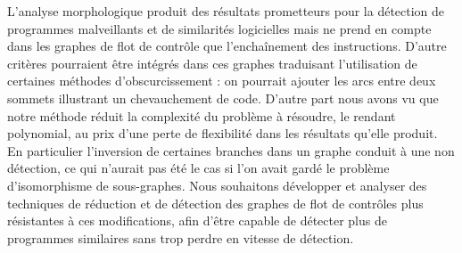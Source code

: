 L'analyse morphologique produit des résultats prometteurs pour la détection de programmes malveillants et de similarités logicielles mais ne prend en compte dans les graphes de flot de contrôle que l'enchaînement des instructions. D'autre critères pourraient être intégrés dans ces graphes traduisant l'utilisation de certaines méthodes d'obscurcissement : on pourrait ajouter les arcs entre deux sommets illustrant un chevauchement de code.
D'autre part nous avons vu que notre méthode réduit la complexité du problème à résoudre, le rendant polynomial, au prix d'une perte de flexibilité dans les résultats qu'elle produit. 
En particulier l'inversion de certaines branches  dans un graphe conduit à une non détection, ce qui n'aurait pas été le cas si l'on avait gardé le problème d'isomorphisme de sous-graphes.
Nous souhaitons développer et analyser des techniques de réduction et de détection des graphes de flot de contrôles plus résistantes à ces modifications, afin d'être capable de détecter plus de programmes similaires sans trop perdre en vitesse de détection.


